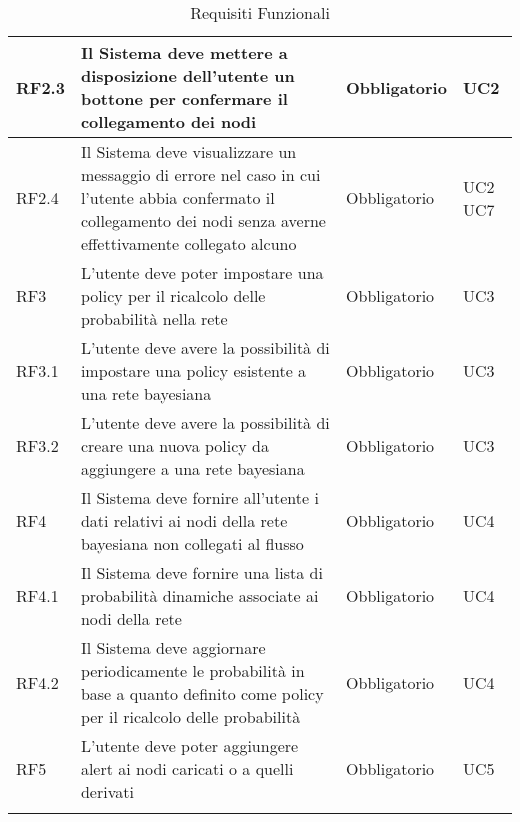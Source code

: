 \begin{center}
\begin{longtable}[c]{|m{}|m{}|m{}|m{}|}
\hline
RF2.3 & Il Sistema deve mettere a disposizione dell'utente un bottone per confermare il collegamento dei nodi & Obbligatorio & UC2\\
\hline
\rowcolor{grigio}RF2.4 & Il Sistema deve visualizzare un messaggio di errore nel caso in cui l'utente abbia confermato il collegamento dei nodi senza averne effettivamente collegato alcuno & Obbligatorio & UC2 UC7\\
\hline
RF3 & L'utente deve poter impostare una policy per il ricalcolo delle probabilità nella rete & Obbligatorio & UC3\\
\hline
\rowcolor{grigio}RF3.1 & L'utente deve avere la possibilità di impostare una policy esistente a una rete bayesiana  & Obbligatorio & UC3\\ 
\hline
RF3.2 & L'utente deve avere la possibilità di creare una nuova policy da aggiungere a una rete bayesiana & Obbligatorio & UC3\\
\hline
\rowcolor{grigio}RF4 & Il Sistema deve fornire all'utente i dati relativi ai nodi della rete bayesiana non collegati al flusso & Obbligatorio & UC4\\
\hline
RF4.1 & Il Sistema deve fornire una lista di probabilità dinamiche associate ai nodi della rete & Obbligatorio & UC4\\
\hline
\rowcolor{grigio}RF4.2 & Il Sistema deve aggiornare periodicamente le probabilità in base a quanto definito come policy per il ricalcolo delle probabilità & Obbligatorio & UC4\\
\hline
RF5 & L'utente deve poter aggiungere alert ai nodi caricati o a quelli derivati & Obbligatorio & UC5\\ 
\hline
\caption{Requisiti Funzionali}
\end{longtable}
\end{center}


